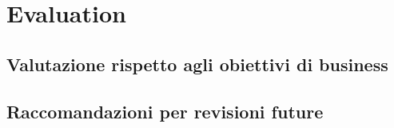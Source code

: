 \section{Evaluation}

\subsection{Valutazione rispetto agli obiettivi di business}

\subsection{Raccomandazioni per revisioni future}
